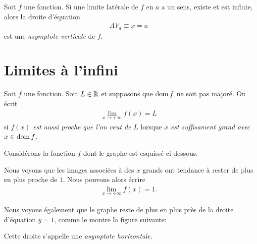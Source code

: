 \documentclass[main.tex]{subfiles}
\begin{document}
\begin{definition}

    Soit $f$ une fonction.
    Si une limite latérale de $f$ en $a$ a un sens, existe et est infinie,
    alors la droite d'équation
    \begin{align}
        AV_a \equiv x = a
    \end{align}
    est une \emph{asymptote verticale} de $f$.
\end{definition}

\section{Limites à l'infini}

\begin{definition}

    Soit $f$ une fonction.
    Soit $L \in \mathbb{R}$ et supposons que $\operatorname{dom} f$ ne soit pas majoré.
    On écrit
    \begin{align}
        \lim_{x \to +\infty} f(x) = L
    \end{align}
    si \emph{$f(x)$ est aussi proche que l'on veut de $L$}
    lorsque \emph{$x$ est suffisament grand avec $x \in \operatorname{dom} f$}.
\end{definition}

\begin{example}

    Considérons la fonction $f$ dont le graphe est esquissé ci-dessous.
    \begin{center}
        \begin{plot}{0.25}{-1}{-3}{30}{5}
        \end{plot}
    \end{center}

    Nous voyons que les images associées à des $x$ grands ont tendance à rester de plus en plus proche de $1$.
    Nous pouvons alors écrire
    \begin{align*}
        \lim_{x \to +\infty} f(x) = 1.
    \end{align*}

    Nous voyons également que le graphe reste de plus en plus près de la droite d'équation $y = 1$,
    comme le montre la figure suivante:
    \begin{center}
        \begin{plot}{0.25}{-1}{-3}{30}{5}
        \end{plot}
    \end{center}

    Cette droite s'appelle une \emph{asymptote horizontale}.
\end{example}
\end{document}
